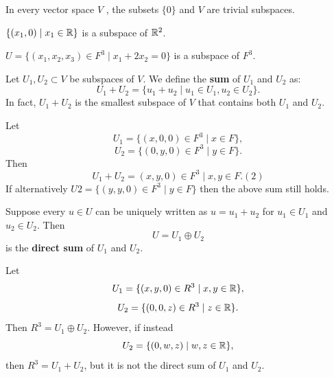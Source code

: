 \documentclass[12pt]{book}
\begin{document}
\begin{examp}\label{exp:subv1}
      In every vector space $V$ , the subsets $\{ 0 \}$ and $V$ are trivial subspaces.      
\end{examp}
\begin{examp}\label{exp:subv2}
      $\{ (x_1, 0) \mid x_1 \in \mathbb{R} \}$ is a subspace of $\mathbb{R}^ 2$.      
\end{examp}
\begin{examp}\label{exp:subv3}
      $U = \{ (x_1, x_2, x_3) \in F^3 \mid x_1 + 2x_2 = 0 \}$ is a subspace of $F^3$.      
\end{examp}

\begin{defi}\label{def:vcs_3}
      Let $U_1, U_2 \subset V$ be subspaces of $V$. We define the \textbf{sum} of $U_1$ and $U_2$ as:
      $$ U_1 + U_2 = \{u_1 + u_2 \mid u_1 \in U_1, u_2 \in U_2 \}.$$
	  In fact, $U_1 + U_2$ is the smallest subspace of $V$ that contains both $U_1$ and $U_2$.
\end{defi}

\begin{examp}\label{exp:subv4}
      Let 
      $$U_1 = \{(x, 0, 0) \in F^3 \mid x \in F \},$$
      $$U_2 = \{(0, y, 0) \in F^3 \mid y \in F \}.$$
      Then
      $$U_1 + U_2 = {(x, y, 0) \in F^3 \mid x, y \in F}. (2)$$
      If alternatively $U2 = \{(y, y, 0) \in F^3 \mid y \in F \}$ then the above sum still holds.    
\end{examp}

\begin{defi}\label{def:vcs_4}
      Suppose every $u \in U$ can be uniquely written as $u = u_1 +u_2$ for $u_1 \in U_1$ and $u_2 \in U_2$. 
	  Then
      $$U = U_1 \oplus U_2$$
      is the \textbf{direct sum} of $U_1$ and $U_2$.
\end{defi}
\begin{examp}\label{exp:subv5}
      Let
      $$U_1 = \{(x, y, 0) \in R^3 \mid x, y \in \mathbb{R} \},$$
      $$U_2 = \{(0, 0, z) \in R^3 \mid z \in \mathbb{R} \}.$$
      Then $R^3 = U_1 \oplus U_2$. However, if instead
      $$U_2 = \{(0,w, z) \mid w, z \in \mathbb{R} \},$$
      then $R^3 = U_1 + U_2$, but it is not the direct sum of $U_1$ and $U_2$.
\end{examp}

\end{document}
